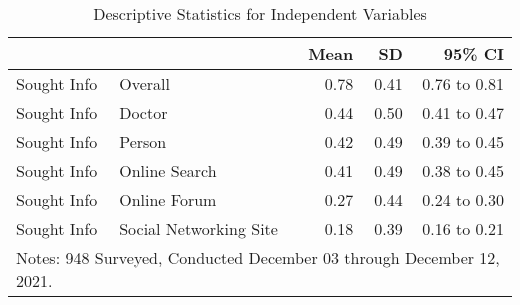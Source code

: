 \begin{table}[!ht]

\caption{\label{tab:table-1-ind}Descriptive Statistics for Independent Variables}
\centering
\begin{tabular}{llrrr}
\toprule
  &    & Mean & SD & 95\% CI\\ \midrule
Sought Info & Overall  &  \num{0.78} & \num{0.41} & \num{0.76} to \num{0.81}\\
Sought Info & Doctor & \num{0.44} & \num{0.50} & \num{0.41} to \num{0.47}\\
Sought Info & Person & \num{0.42} & \num{0.49} & \num{0.39} to \num{0.45}\\
Sought Info & Online Search & \num{0.41} & \num{0.49} & \num{0.38} to \num{0.45}\\
Sought Info & Online Forum & \num{0.27} & \num{0.44} & \num{0.24} to \num{0.30}\\
Sought Info & Social Networking Site & \num{0.18} & \num{0.39} & \num{0.16} to \num{0.21}\\
\bottomrule
\multicolumn{5}{l}{\rule{0pt}{1em}Notes: 948 Surveyed, Conducted December 03 through December 12, 2021.}\\
\end{tabular}
\end{table}